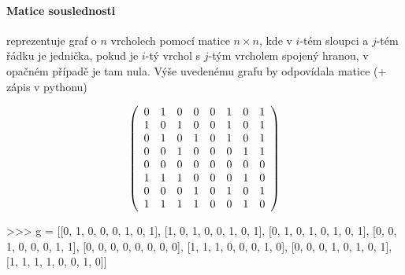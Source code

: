 \paragraph{Matice souslednosti} reprezentuje graf o $n$ vrcholech pomocí matice $n\times n$, kde v $i$-tém sloupci a $j$-tém řádku je jednička, pokud
je $i$-tý vrchol s $j$-tým vrcholem spojený hranou, v opačném případě je tam nula. Výše uvedenému grafu by odpovídala matice (+ zápis v pythonu)
\begin{center}
\begin{minipage}{3.5cm}
$$
\left(
\begin{array}{cccccccc}
0 & 1 & 0 & 0 & 0 & 1 & 0 & 1\cr
1 & 0 & 1 & 0 & 0 & 1 & 0 & 1\cr
0 & 1 & 0 & 1 & 0 & 1 & 0 & 1\cr
0 & 0 & 1 & 0 & 0 & 0 & 1 & 1\cr
0 & 0 & 0 & 0 & 0 & 0 & 0 & 0\cr
1 & 1 & 1 & 0 & 0 & 0 & 1 & 0\cr
0 & 0 & 0 & 1 & 0 & 1 & 0 & 1\cr
1 & 1 & 1 & 1 & 0 & 0 & 1 & 0\cr
\end{array}
\right)
$$
\end{minipage}
\hskip2cm
\begin{minipage}{7cm}
\begin{python}
>>> g = [[0, 1, 0, 0, 0, 1, 0, 1],
	 [1, 0, 1, 0, 0, 1, 0, 1],
	 [0, 1, 0, 1, 0, 1, 0, 1],
	 [0, 0, 1, 0, 0, 0, 1, 1],
	 [0, 0, 0, 0, 0, 0, 0, 0],
	 [1, 1, 1, 0, 0, 0, 1, 0],
	 [0, 0, 0, 1, 0, 1, 0, 1],
	 [1, 1, 1, 1, 0, 0, 1, 0]]
\end{python}
\end{minipage}
\end{center}

